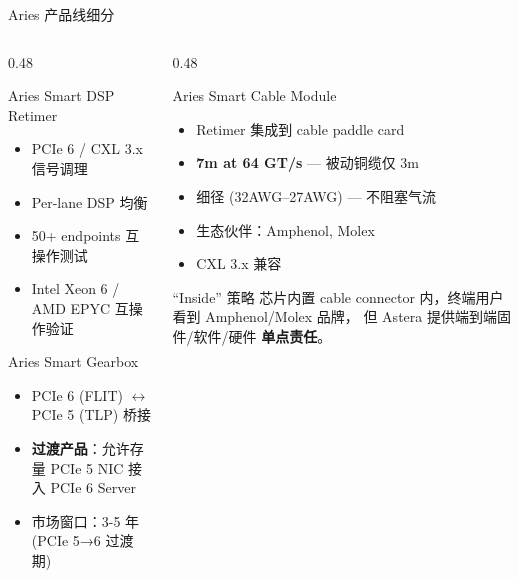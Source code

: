 \documentclass[aspectratio=169, 10pt, UTF8]{ctexbeamer}
\begin{document}
\begin{frame}{Aries 产品线细分}
  \begin{columns}[T]
    \begin{column}{0.48\textwidth}
      \begin{block}{Aries Smart DSP Retimer}
        \begin{itemize}
          \item PCIe 6 / CXL 3.x 信号调理
          \item Per-lane DSP 均衡
          \item 50+ endpoints 互操作测试
          \item Intel Xeon 6 / AMD EPYC 互操作验证
        \end{itemize}
      \end{block}

      \begin{block}{Aries Smart Gearbox}
        \begin{itemize}
          \item PCIe 6 (FLIT) $\leftrightarrow$ PCIe 5 (TLP) 桥接
          \item \textbf{过渡产品}：允许存量 PCIe 5 NIC 接入 PCIe 6 Server
          \item 市场窗口：3-5 年 (PCIe 5→6 过渡期)
        \end{itemize}
      \end{block}
    \end{column}
    \begin{column}{0.48\textwidth}
      \begin{exampleblock}{Aries Smart Cable Module}
        \begin{itemize}
          \item Retimer 集成到 cable paddle card
          \item \textbf{7m at 64 GT/s} — 被动铜缆仅 3m
          \item 细径 (32AWG–27AWG) — 不阻塞气流
          \item 生态伙伴：Amphenol, Molex
          \item CXL 3.x 兼容
        \end{itemize}
      \end{exampleblock}

      \begin{alertblock}{``Inside'' 策略}
        芯片内置 cable connector 内，终端用户看到 Amphenol/Molex 品牌，
        但 Astera 提供端到端固件/软件/硬件 \textbf{单点责任}。
      \end{alertblock}
    \end{column}
  \end{columns}
\end{frame}
\end{document}
